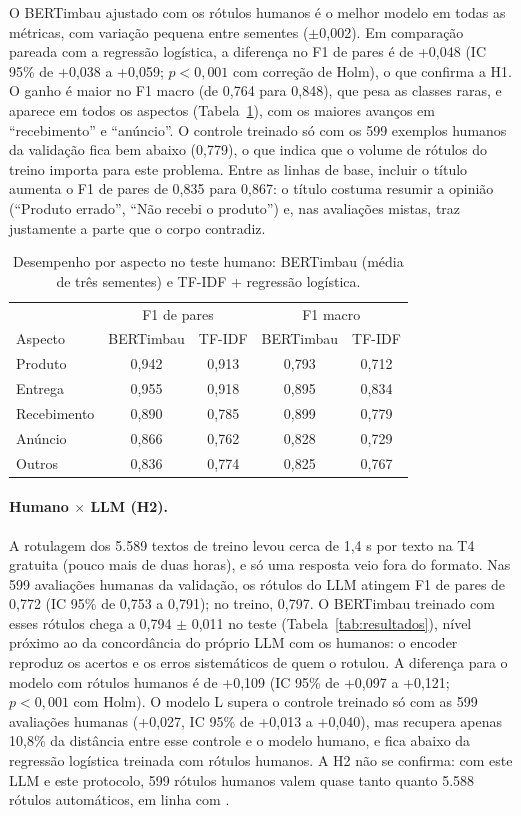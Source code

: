 \documentclass[a4paper, twocolumn, 11pt, twoside]{article}
\begin{document}
O BERTimbau ajustado com os rótulos humanos é o melhor modelo em todas as métricas, com variação pequena entre sementes ($\pm$0,002). Em comparação pareada com a regressão logística, a diferença no F1 de pares é de +0,048 (IC 95\% de +0,038 a +0,059; $p < 0{,}001$ com correção de Holm), o que confirma a H1. O ganho é maior no F1 macro (de 0,764 para 0,848), que pesa as classes raras, e aparece em todos os aspectos (Tabela~\ref{tab:aspectos}), com os maiores avanços em ``recebimento'' e ``anúncio''. O controle treinado só com os 599 exemplos humanos da validação fica bem abaixo (0,779), o que indica que o volume de rótulos do treino importa para este problema. Entre as linhas de base, incluir o título aumenta o F1 de pares de 0,835 para 0,867: o título costuma resumir a opinião (``Produto errado'', ``Não recebi o produto'') e, nas avaliações mistas, traz justamente a parte que o corpo contradiz.

\begin{table}[htb]
\centering
\small
\begin{tabular}{lcccc}
\toprule
 & \multicolumn{2}{c}{F1 de pares} & \multicolumn{2}{c}{F1 macro} \\
Aspecto & BERTimbau & TF-IDF & BERTimbau & TF-IDF \\
\midrule
Produto     & 0,942 & 0,913 & 0,793 & 0,712 \\
Entrega     & 0,955 & 0,918 & 0,895 & 0,834 \\
Recebimento & 0,890 & 0,785 & 0,899 & 0,779 \\
Anúncio     & 0,866 & 0,762 & 0,828 & 0,729 \\
Outros      & 0,836 & 0,774 & 0,825 & 0,767 \\
\bottomrule
\end{tabular}
\caption{Desempenho por aspecto no teste humano: BERTimbau (média de três sementes) e TF-IDF + regressão logística.}
\label{tab:aspectos}
\end{table}

\paragraph{Humano $\times$ LLM (H2).} A rotulagem dos 5.589 textos de treino levou cerca de 1,4 s por texto na T4 gratuita (pouco mais de duas horas), e só uma resposta veio fora do formato. Nas 599 avaliações humanas da validação, os rótulos do LLM atingem F1 de pares de 0,772 (IC 95\% de 0,753 a 0,791); no treino, 0,797. O BERTimbau treinado com esses rótulos chega a 0,794 $\pm$ 0,011 no teste (Tabela~\ref{tab:resultados}), nível próximo ao da concordância do próprio LLM com os humanos: o encoder reproduz os acertos e os erros sistemáticos de quem o rotulou. A diferença para o modelo com rótulos humanos é de +0,109 (IC 95\% de +0,097 a +0,121; $p < 0{,}001$ com Holm). O modelo L supera o controle treinado só com as 599 avaliações humanas (+0,027, IC 95\% de +0,013 a +0,040), mas recupera apenas 10,8\% da distância entre esse controle e o modelo humano, e fica abaixo da regressão logística treinada com rótulos humanos. A H2 não se confirma: com este LLM e este protocolo, 599 rótulos humanos valem quase tanto quanto 5.588 rótulos automáticos, em linha com \citet{zhu2023weaker}.
\end{document}
